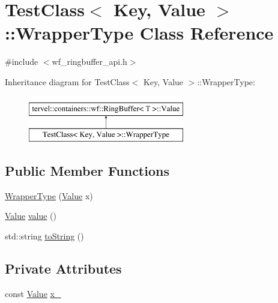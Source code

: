 \hypertarget{class_test_class_1_1_wrapper_type}{}\section{Test\+Class$<$ Key, Value $>$\+:\+:Wrapper\+Type Class Reference}
\label{class_test_class_1_1_wrapper_type}


{\ttfamily \#include $<$wf\+\_\+ringbuffer\+\_\+api.\+h$>$}

Inheritance diagram for Test\+Class$<$ Key, Value $>$\+:\+:Wrapper\+Type\+:\begin{figure}[H]
\begin{center}
\leavevmode
\includegraphics[height=2.000000cm]{class_test_class_1_1_wrapper_type}
\end{center}
\end{figure}
\subsection*{Public Member Functions}
\begin{DoxyCompactItemize}
\item 
\hyperlink{class_test_class_1_1_wrapper_type_a2b0268ce9a34cd9c0f2b8467183fb318}{Wrapper\+Type} (\hyperlink{hash__map_2test_object_8h_ad777bf08d8e2b01df17ba5e3c51ae11f}{Value} x)
\item 
\hyperlink{hash__map_2test_object_8h_ad777bf08d8e2b01df17ba5e3c51ae11f}{Value} \hyperlink{class_test_class_1_1_wrapper_type_a4fcbd1e5ed510805606d3598b00a96ec}{value} ()
\item 
std\+::string \hyperlink{class_test_class_1_1_wrapper_type_acd68ad5a338a5ad57708c9d912401a3f}{to\+String} ()
\end{DoxyCompactItemize}
\subsection*{Private Attributes}
\begin{DoxyCompactItemize}
\item 
const \hyperlink{hash__map_2test_object_8h_ad777bf08d8e2b01df17ba5e3c51ae11f}{Value} \hyperlink{class_test_class_1_1_wrapper_type_a54229b2608aca867a7c60ac474072fad}{x\+\_\+}
\end{DoxyCompactItemize}
